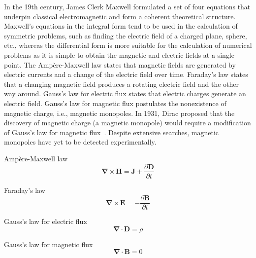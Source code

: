 In the 19th century, James Clerk Maxwell formulated a set of four equations that underpin classical electromagnetic and form a coherent theoretical structure. 
Maxwell's equations in the integral form tend to be used in the calculation of symmetric problems, such as finding the electric field of a charged plane, sphere, etc., whereas the differential form is more suitable for the calculation of numerical problems as it is simple to obtain the magnetic and electric fields at a single point. The Ampère-Maxwell law states that magnetic fields are generated by electric currents and a change of the electric field over time. Faraday's law states that a changing magnetic field produces a rotating electric field and the other way around. Gauss's law for electric flux states that electric charges generate an electric field. Gauss's law for magnetic flux postulates the nonexistence of magnetic charge, i.e., magnetic monopoles. In 1931, Dirac proposed that the discovery of magnetic charge (a magnetic monopole) would require a modification of Gauss's law for magnetic flux~\cite{dirac1931monopole}.  Despite extensive searches, magnetic monopoles have yet to be detected experimentally. 


Ampère-Maxwell law
\begin{equation}
  \pmb{\nabla} \times \mathbf{H} =\mathbf{J} + \frac{\partial \mathbf{D}}{\partial t}
\end{equation}

Faraday's law
\begin{equation}
  \pmb{\nabla} \times \mathbf{E} = - \frac{\partial \mathbf{B}}{\partial t}
\end{equation}

Gauss's law for electric flux
\begin{equation}
  \pmb{\nabla} \cdot \mathbf{D} = \rho
\end{equation}

Gauss's law for magnetic flux
\begin{equation}
\pmb{\nabla} \cdot \mathbf{B} = 0
\end{equation}




